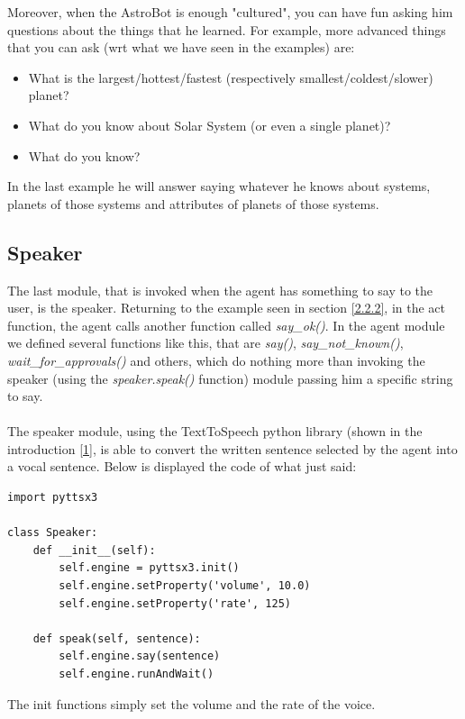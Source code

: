 \documentclass[12pt, a4paper]{article}
\begin{document}
Moreover, when the AstroBot is enough "cultured", you can have fun asking him questions about the things that he learned.
For example, more advanced things that you can ask (wrt what we have seen in the examples) are:
\begin{itemize}
	\item What is the largest/hottest/fastest (respectively smallest/coldest/slower) planet?
	\item What do you know about Solar System (or even a single planet)?
	\item What do you know?
\end{itemize}
In the last example he will answer saying whatever he knows about systems, planets of those systems and attributes of planets of those systems.

\subsection{Speaker}
The last module, that is invoked when the agent has something to say to the user, is the speaker.
Returning to the example seen in section \ref{2.2.2}, in the act function, the agent calls another function called \textit{say\_ok()}.
In the agent module we defined several functions like this, that are \textit{say()}, \textit{say\_not\_known()}, \textit{wait\_for\_approvals()} and others, which do nothing more than invoking the speaker (using the \textit{speaker.speak()} function) module passing him a specific string to say.
\\\\The speaker module, using the TextToSpeech python library (shown in the introduction \ref{1}, is able to convert the written sentence selected by the agent into a vocal sentence.
Below is displayed the code of what just said:
\begin{lstlisting}
import pyttsx3

class Speaker:
	def __init__(self):
		self.engine = pyttsx3.init()
		self.engine.setProperty('volume', 10.0)
		self.engine.setProperty('rate', 125)

	def speak(self, sentence):
		self.engine.say(sentence)
		self.engine.runAndWait()
\end{lstlisting}
The init functions simply set the volume and the rate of the voice.
\end{document}
